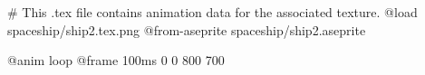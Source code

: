 # This .tex file contains animation data for the associated texture.
@load spaceship/ship2.tex.png
@from-aseprite spaceship/ship2.aseprite

@anim loop
	@frame 100ms 0 0 800 700
